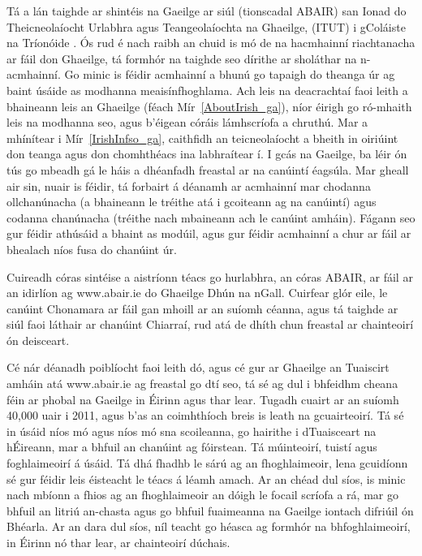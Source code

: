 \begin{multicols}{2}
Tá a lán taighde ar shintéis na Gaeilge ar siúl (tionscadal ABAIR) san Ionad do Theicneolaíocht Urlabhra agus Teangeolaíochta na Ghaeilge, (ITUT) i gColáiste na Tríonóide \cite{pittsburgh}. Ós rud é nach raibh an chuid is mó de na hacmhainní riachtanacha ar fáil don Ghaeilge, tá formhór na taighde seo dírithe ar sholáthar na n-acmhainní. Go minic is féidir acmhainní a bhunú go tapaigh do theanga úr ag baint úsáide as modhanna meaisínfhoghlama. Ach leis na deacrachtaí faoi leith a bhaineann leis an Ghaeilge (féach Mír~\ref{AboutIrish_ga}), níor éirigh go ró-mhaith leis na modhanna seo, agus b’éigean córáis lámhscríofa a chruthú. Mar a mhínítear i Mír~\ref{IrishInfso_ga}, caithfidh an teicneolaíocht a bheith in oiriúint don teanga agus don chomhthéacs ina labhraítear í. I gcás na Gaeilge, ba léir ón tús go mbeadh gá le háis a dhéanfadh freastal ar na canúintí éagsúla. Mar gheall air sin, nuair is féidir, tá forbairt á déanamh ar acmhainní mar chodanna ollchanúnacha (a bhaineann le tréithe atá i gcoiteann ag na canúintí) agus codanna chanúnacha (tréithe nach mbaineann ach le canúint amháin). Fágann seo gur féidir athúsáid a bhaint as modúil, agus gur féidir acmhainní a chur ar fáil ar bhealach níos fusa do chanúint úr.

Cuireadh córas sintéise a aistríonn téacs go hurlabhra, an córas ABAIR, ar fáil ar an idirlíon ag www.abair.ie do Ghaeilge Dhún na nGall. Cuirfear glór eile, le canúint Chonamara ar fáil gan mhoill ar an suíomh céanna, agus tá taighde ar siúl faoi láthair ar chanúint Chiarraí, rud atá de dhíth chun freastal ar chainteoirí ón deisceart.

Cé nár déanadh poiblíocht faoi leith dó, agus cé gur ar Ghaeilge an Tuaiscirt amháin atá www.abair.ie ag freastal go dtí seo, tá sé ag dul i bhfeidhm cheana féin ar phobal na Gaeilge in Éirinn agus thar lear. Tugadh cuairt ar an suíomh 40,000 uair i 2011, agus b’as an coimhthíoch breis is leath na gcuairteoirí. Tá sé in úsáid níos mó agus níos mó sna scoileanna, go hairithe i dTuaisceart na hÉireann, mar a bhfuil an chanúint ag fóirstean. Tá múinteoirí, tuistí agus foghlaimeoirí á úsáid. Tá dhá fhadhb le sárú ag an fhoghlaimeoir, lena gcuidíonn sé gur féidir leis éisteacht le téacs á léamh amach. Ar an chéad dul síos, is minic nach mbíonn a fhios ag an fhoghlaimeoir an dóigh le focail scríofa a rá, mar go bhfuil an litriú an-chasta agus go bhfuil fuaimeanna na Gaeilge iontach difriúil ón Bhéarla. Ar an dara dul síos, níl teacht go héasca ag formhór na bhfoghlaimeoirí, in Éirinn nó thar lear, ar chainteoirí dúchais.


\end{multicols}
